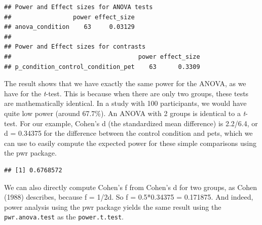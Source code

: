 \documentclass[]{book}
\newenvironment{Shaded}{\begin{snugshade}}{\end{snugshade}}
\newcommand{\DataTypeTok}[1]{\textcolor[rgb]{0.13,0.29,0.53}{#1}}
\newcommand{\DecValTok}[1]{\textcolor[rgb]{0.00,0.00,0.81}{#1}}
\newcommand{\FloatTok}[1]{\textcolor[rgb]{0.00,0.00,0.81}{#1}}
\newcommand{\KeywordTok}[1]{\textcolor[rgb]{0.13,0.29,0.53}{\textbf{#1}}}
\newcommand{\NormalTok}[1]{#1}
\newcommand{\OperatorTok}[1]{\textcolor[rgb]{0.81,0.36,0.00}{\textbf{#1}}}
\newcommand{\StringTok}[1]{\textcolor[rgb]{0.31,0.60,0.02}{#1}}
\begin{document}
\begin{verbatim}
## Power and Effect sizes for ANOVA tests
##                 power effect_size
## anova_condition    63     0.03129
## 
## Power and Effect sizes for contrasts
##                                   power effect_size
## p_condition_control_condition_pet    63      0.3309
\end{verbatim}

The result shows that we have exactly the same power for the ANOVA, as we have for the \emph{t}-test. This is because when there are only two groups, these tests are mathematically identical. In a study with 100 participants, we would have quite low power (around 67.7\%). An ANOVA with 2 groups is identical to a \emph{t}-test. For our example, Cohen's d (the standardized mean difference) is 2.2/6.4, or d = 0.34375 for the difference between the control condition and pets, which we can use to easily compute the expected power for these simple comparisons using the pwr package.

\begin{Shaded}
\end{Shaded}

\begin{verbatim}
## [1] 0.6768572
\end{verbatim}

We can also directly compute Cohen's f from Cohen's d for two groups, as Cohen (1988) describes, because f = 1/2d. So f = 0.5*0.34375 = 0.171875. And indeed, power analysis using the pwr package yields the same result using the \texttt{pwr.anova.test} as the \texttt{power.t.test}.

\begin{Shaded}
\end{Shaded}
\end{document}
